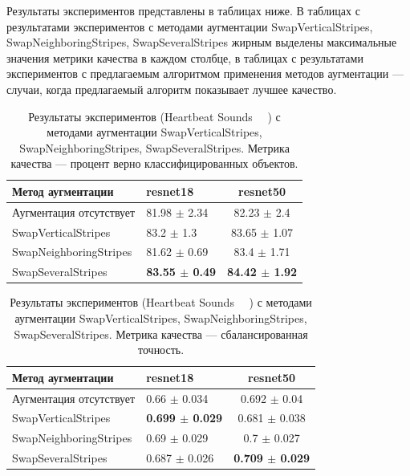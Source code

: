 \documentclass[12pt, fleqn]{article}
\begin{document}
Результаты экспериментов представлены в таблицах ниже. В таблицах с результатами экспериментов с методами аугментации SwapVerticalStripes, SwapNeighboringStripes, SwapSeveralStripes жирным выделены максимальные значения метрики качества в каждом столбце, в таблицах с результатами экспериментов с предлагаемым алгоритмом применения методов аугментации --- случаи, когда предлагаемый алгоритм показывает лучшее качество.
\begin{table}[ht!]
    \centering
	\begin{tabular}{| l | l | c |}
    	\hline
	    Метод аугментации & resnet18 & resnet50 \\ \hline
	    Аугментация отсутствует  & 81.98 $\pm$ 2.34 & 82.23 $\pm$ 2.4 \\ \hline
	    SwapVerticalStripes & 83.2 $\pm$ 1.3 & 83.65 $\pm$ 1.07 \\ \hline
	    SwapNeighboringStripes & 81.62 $\pm$ 0.69 & 83.4 $\pm$ 1.71 \\ \hline
	    SwapSeveralStripes & \textbf{83.55 $\pm$ 0.49} & \textbf{84.42 $\pm$ 1.92} \\ \hline
	\end{tabular}
	\caption{Результаты экспериментов (Heartbeat Sounds ~\cite{HeartbeatSoundsArticle}~\cite{HeartbeatSoundsKaggle}) с методами аугментации SwapVerticalStripes, SwapNeighboringStripes, SwapSeveralStripes. Метрика качества --- процент верно классифицированных объектов.}
	\label{table:lukianov_pavel_t1}
\end{table}

\begin{table}[ht!]
    \centering
	\begin{tabular}{| l | l | c |}
    	\hline
	    Метод аугментации & resnet18 & resnet50 \\ \hline
	    Аугментация отсутствует  & 0.66 $\pm$ 0.034 & 0.692 $\pm$ 0.04 \\ \hline
	    SwapVerticalStripes & \textbf{0.699 $\pm$ 0.029} & 0.681 $\pm$ 0.038 \\ \hline
	    SwapNeighboringStripes & 0.69 $\pm$ 0.029 & 0.7 $\pm$ 0.027 \\ \hline
	    SwapSeveralStripes & 0.687 $\pm$ 0.026 & \textbf{0.709 $\pm$ 0.029} \\ \hline
	\end{tabular}
	\caption{Результаты экспериментов (Heartbeat Sounds ~\cite{HeartbeatSoundsArticle}~\cite{HeartbeatSoundsKaggle}) с методами аугментации SwapVerticalStripes, SwapNeighboringStripes, SwapSeveralStripes. Метрика качества --- сбалансированная точность.}
	\label{table:lukianov_pavel_t2}
\end{table}
\end{document}
